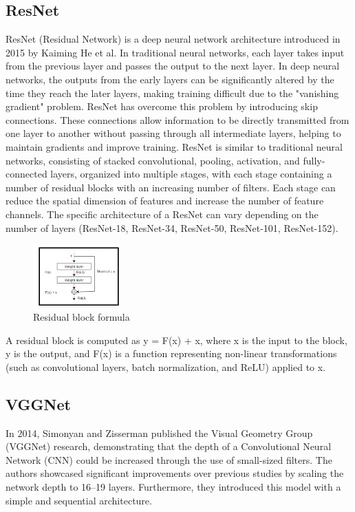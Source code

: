 \documentclass[pdflatex,sn-mathphys-num]{sn-jnl}%
\theoremstyle{thmstyleone}%
\theoremstyle{thmstyletwo}%
\theoremstyle{thmstylethree}%
\begin{document}
\subsection{ResNet}
ResNet (Residual Network) is a deep neural network architecture introduced in 2015 by Kaiming He et al. In traditional neural networks, each layer takes input from the previous layer and passes the output to the next layer. In deep neural networks, the outputs from the early layers can be significantly altered by the time they reach the later layers, making training difficult due to the "vanishing gradient" problem. ResNet has overcome this problem by introducing skip connections. These connections allow information to be directly transmitted from one layer to another without passing through all intermediate layers, helping to maintain gradients and improve training. ResNet is similar to traditional neural networks, consisting of stacked convolutional, pooling, activation, and fully-connected layers, organized into multiple stages, with each stage containing a number of residual blocks with an increasing number of filters. Each stage can reduce the spatial dimension of features and increase the number of feature channels. The specific architecture of a ResNet can vary depending on the number of layers (ResNet-18, ResNet-34, ResNet-50, ResNet-101, ResNet-152).


\begin{figure}[h]
  \centering
  \includegraphics[width=0.3\textwidth]{Figures/residual2.png}
   \caption{Residual block formula}
  \label{fig:h4}
\end{figure}
A residual block is computed as y = F(x) + x, where x is the input to the block, y is the output, and F(x) is a function representing non-linear transformations (such as convolutional layers, batch normalization, and ReLU) applied to x. 

\subsection{VGGNet}
In 2014, Simonyan and Zisserman published the Visual Geometry Group (VGGNet) research, demonstrating that the depth of a Convolutional Neural Network (CNN) could be increased through the use of small-sized filters. The authors showcased significant improvements over previous studies by scaling the network depth to 16–19 layers. Furthermore, they introduced this model with a simple and sequential architecture.
\end{document}

